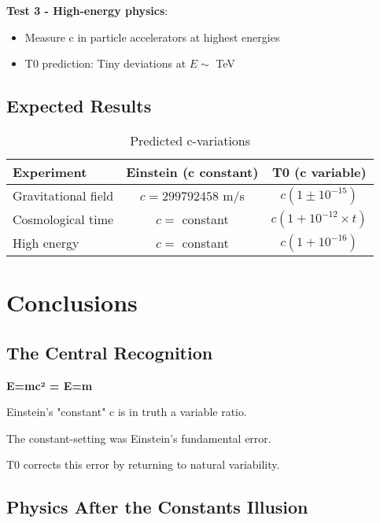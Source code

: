 \documentclass[12pt,a4paper]{article}
\begin{document}
	\textbf{Test 3 - High-energy physics}:
	\begin{itemize}
		\item Measure c in particle accelerators at highest energies
		\item T0 prediction: Tiny deviations at $E \sim$ TeV
	\end{itemize}
	
	\subsection{Expected Results}
	
	\begin{table}[htbp]
		\centering
		\begin{tabular}{|l|c|c|}
			\hline
			\textbf{Experiment} & \textbf{Einstein (c constant)} & \textbf{T0 (c variable)} \\
			\hline
			Gravitational field & $c = 299792458$ m/s & $c(1 \pm 10^{-15})$ \\
			Cosmological time & $c = $ constant & $c(1 + 10^{-12} \times t)$ \\
			High energy & $c = $ constant & $c(1 + 10^{-16})$ \\
			\hline
		\end{tabular}
		\caption{Predicted c-variations}
	\end{table}
	
	\section{Conclusions}
	
	\subsection{The Central Recognition}
	
	\begin{tcolorbox}[colback=green!5!white,colframe=green!75!black,title=The Fundamental Truth]
		\textbf{E=mc² = E=m}
		
		Einstein's "constant" c is in truth a variable ratio.
		
		The constant-setting was Einstein's fundamental error.
		
		T0 corrects this error by returning to natural variability.
	\end{tcolorbox}
	
	\subsection{Physics After the Constants Illusion}
	
\end{document}
